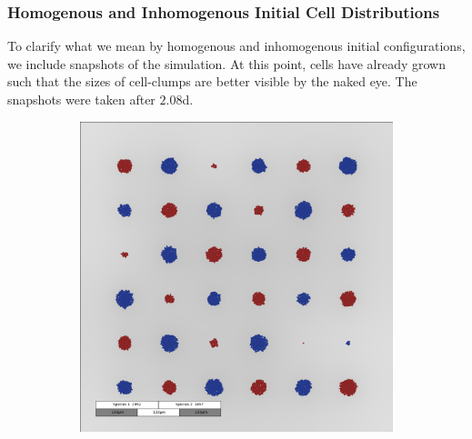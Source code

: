 \documentclass[10pt,A4paper]{article}
\numberwithin{equation}{section}
\begin{document}
\subsubsection{Homogenous and Inhomogenous Initial Cell Distributions}
To clarify what we mean by homogenous and inhomogenous initial configurations, we include snapshots of the simulation.
At this point, cells have already grown such that the sizes of cell-clumps are better visible by the naked eye.
The snapshots were taken after $2.08$\unit{\day}.
\begin{figure}
    \centering
    \begin{subfigure}[c]{0.5\textwidth}
        \includegraphics[width=\textwidth]{Figures/abm-homogenous/snapshot_00012000.png}
    \end{subfigure}%
    \begin{subfigure}[c]{0.5\textwidth}

\end{subfigure}
\end{figure}
\end{document}
